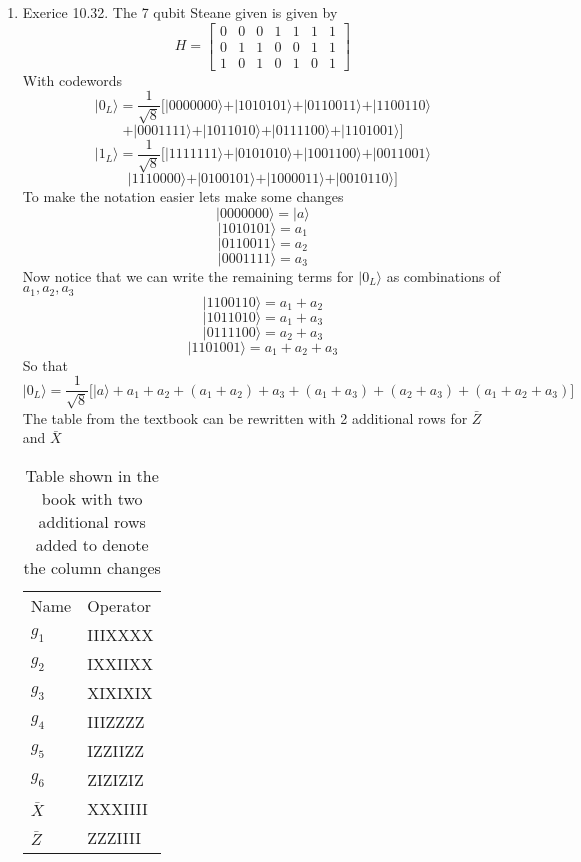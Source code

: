 \documentclass[12pt]{article}
\newcommand{\ket}[1]{\vert{#1}\rangle}
\begin{document}
\begin{enumerate}
    \item Exerice 10.32. The 7 qubit Steane given is given by 
    $$ H = \begin{bmatrix}
        0&0&0&1&1&1&1 \\ 0&1&1&0&0&1&1 \\ 1&0&1&0&1&0&1 
    \end{bmatrix} $$
    With codewords 
    $$ \ket{0_L} = \frac{1}{\sqrt{8}} \Big[ \ket{0000000} + \ket{1010101} + \ket{0110011} + \ket{1100110} $$
    $$ + \ket{0001111} + \ket{1011010} + \ket{0111100} + \ket{1101001} \Big] $$
    $$ \ket{1_L} = \frac{1}{\sqrt{8}} \Big[ \ket{1111111} + \ket{0101010} + \ket{1001100} + \ket{0011001} $$
    $$ \ket{1110000} + \ket{0100101} + \ket{1000011} + \ket{0010110} \Big] $$
    To make the notation easier lets make some changes 
    $$ \ket{0000000} = \ket{a} $$
    $$ \ket{1010101} = a_1 $$
    $$ \ket{0110011} = a_2 $$
    $$ \ket{0001111} = a_3 $$
    Now notice that we can write the remaining terms for $\ket{0_L}$ as combinations of $a_1, a_2, a_3$
    $$ \ket{1100110} = a_1 + a_2 $$
    $$ \ket{1011010} = a_1 + a_3 $$
    $$ \ket{0111100} = a_2 + a_3 $$
    $$ \ket{1101001} = a_1 + a_2 + a_3 $$
    So that 
    $$ \ket{0_L} = \frac{1}{\sqrt{8}} \Big[ \ket{a} + a_1 + a_2 + (a_1 + a_2) + a_3 + (a_1 + a_3) + (a_2 + a_3) + (a_1 + a_2 +a_3) ] $$
    The table from the textbook can be rewritten with 2 additional rows for $\bar{Z}$ and $\bar{X}$
    \begin{table}[h]
        \centering
        \begin{tabular}{ll}
        \hline
        \multicolumn{1}{l|}{Name}  & Operator \\
        \multicolumn{1}{l|}{$g_1$} & IIIXXXX  \\
        \multicolumn{1}{l|}{$g_2$} & IXXIIXX  \\
        \multicolumn{1}{l|}{$g_3$} & XIXIXIX  \\
        \multicolumn{1}{l|}{$g_4$} & IIIZZZZ  \\
        \multicolumn{1}{l|}{$g_5$} & IZZIIZZ  \\
        \multicolumn{1}{l|}{$g_6$} & ZIZIZIZ  \\ \hline
        $\bar{X}$                  & XXXIIII  \\
        $\bar{Z}$                  & ZZZIIII 
        \end{tabular}
        \caption{Table shown in the book with two additional rows added to denote the column changes}
        \label{tab:my-table}
        \end{table}

\end{enumerate}
\end{document}
